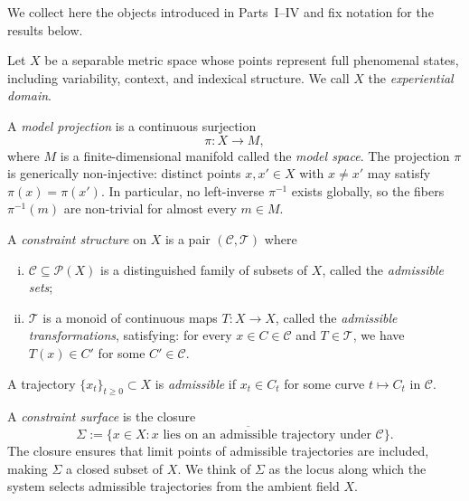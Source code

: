\documentclass[11pt,openany]{book}
\begin{document}
We collect here the objects introduced in Parts~I--IV and fix
notation for the results below.

\begin{definition}
Let $X$ be a separable metric space whose points represent
full phenomenal states, including variability, context, and
indexical structure.  We call $X$ the \emph{experiential
domain}.
\end{definition}

\begin{definition}
A \emph{model projection} is a continuous surjection
\[
  \pi : X \to M,
\]
where $M$ is a finite-dimensional manifold called the
\emph{model space}.  The projection $\pi$ is generically
non-injective: distinct points $x, x' \in X$ with $x \neq x'$
may satisfy $\pi(x) = \pi(x')$.  In particular, no
left-inverse $\pi^{-1}$ exists globally, so the fibers
$\pi^{-1}(m)$ are non-trivial for almost every $m \in M$.
\end{definition}

\begin{definition}
\label{def:constraint-structure}
A \emph{constraint structure} on $X$ is a pair
$(\mathcal{C}, \mathcal{T})$ where
\begin{enumerate}[(i)]
  \item $\mathcal{C} \subseteq \mathcal{P}(X)$ is a
    distinguished family of subsets of $X$, called the
    \emph{admissible sets};
  \item $\mathcal{T}$ is a monoid of continuous maps
    $T : X \to X$, called the \emph{admissible transformations},
    satisfying: for every $x \in C \in \mathcal{C}$ and
    $T \in \mathcal{T}$, we have $T(x) \in C'$ for some
    $C' \in \mathcal{C}$.
\end{enumerate}
A trajectory $\{x_t\}_{t \ge 0} \subset X$ is
\emph{admissible} if $x_t \in C_t$ for some curve
$t \mapsto C_t$ in $\mathcal{C}$.
\end{definition}

\begin{definition}
\label{def:constraint-surface}
A \emph{constraint surface} is the closure
\[
  \Sigma := \overline{\bigl\{x \in X : x \text{ lies on an
    admissible trajectory under } \mathcal{C}\bigr\}}.
\]
The closure ensures that limit points of admissible
trajectories are included, making $\Sigma$ a closed subset
of $X$.  We think of $\Sigma$ as the locus along which the
system selects admissible trajectories from the ambient
field $X$.
\end{definition}
\end{document}
